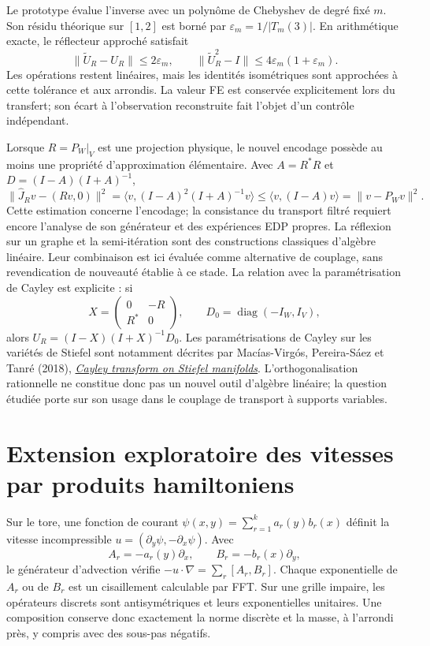 \documentclass[11pt,a4paper]{article}
\begin{document}
Le prototype évalue l'inverse avec un polynôme de Chebyshev de degré
fixé $m$. Son résidu théorique sur $[1,2]$ est borné par
$\varepsilon_m=1/|T_m(3)|$. En arithmétique exacte, le réflecteur
approché satisfait
\[
 \|\widetilde U_R-U_R\|\leq2\varepsilon_m,\qquad
 \|\widetilde U_R^2-I\|\leq4\varepsilon_m(1+\varepsilon_m).
\]
Les opérations restent linéaires, mais les identités isométriques sont
approchées à cette tolérance et aux arrondis. La valeur FE est conservée
explicitement lors du transfert; son écart à l'observation reconstruite
fait l'objet d'un contrôle indépendant.

Lorsque $R=P_W|_V$ est une projection physique, le nouvel encodage
possède au moins une propriété d'approximation élémentaire. Avec
$A=R^*R$ et $D=(I-A)(I+A)^{-1}$,
\[
 \|\widehat J_Rv-(Rv,0)\|^2
 =\langle v,(I-A)^2(I+A)^{-1}v\rangle
 \leq\langle v,(I-A)v\rangle=\|v-P_Wv\|^2.
\]
Cette estimation concerne l'encodage; la consistance du transport
filtré requiert encore l'analyse de son générateur et des expériences
EDP propres. La réflexion sur un graphe et la semi-itération sont des
constructions classiques d'algèbre linéaire. Leur combinaison est ici
évaluée comme alternative de couplage, sans revendication de nouveauté
établie à ce stade.
La relation avec la paramétrisation de Cayley est explicite : si
\[
 X=\begin{pmatrix}0&-R\\R^*&0\end{pmatrix},\qquad
 D_0=\operatorname{diag}(-I_W,I_V),
\]
alors $U_R=(I-X)(I+X)^{-1}D_0$. Les paramétrisations de Cayley
sur les variétés de Stiefel sont notamment décrites par
Mac\'ias-Virg\'os, Pereira-S\'aez et Tanr\'e (2018),
\href{https://doi.org/10.1016/j.geomphys.2017.08.011}{\emph{Cayley transform on Stiefel manifolds}}.
L'orthogonalisation rationnelle ne constitue donc pas un nouvel outil
d'algèbre linéaire; la question étudiée porte sur son usage dans le
couplage de transport à supports variables.

\section{Extension exploratoire des vitesses par produits hamiltoniens}
Sur le tore, une fonction de courant
$\psi(x,y)=\sum_{r=1}^k a_r(y)b_r(x)$ définit la vitesse incompressible
$u=(\partial_y\psi,-\partial_x\psi)$. Avec
\[
 A_r=-a_r(y)\partial_x,\qquad B_r=-b_r(x)\partial_y,
\]
le générateur d'advection vérifie
$-u\cdot\nabla=\sum_r[A_r,B_r]$. Chaque exponentielle de $A_r$ ou de $B_r$
est un cisaillement calculable par FFT. Sur une grille impaire, les
opérateurs discrets sont antisymétriques et leurs exponentielles unitaires.
Une composition conserve donc exactement la norme discrète et la masse,
à l'arrondi près, y compris avec des sous-pas négatifs.
\end{document}
